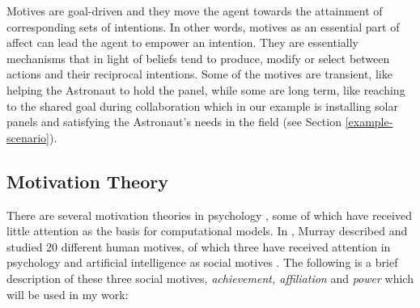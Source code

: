 \documentclass[12pt]{report}
\begin{document}
Motives are goal-driven and they move the agent towards the attainment of
corresponding sets of intentions. In other words, motives as an essential part
of affect can lead the agent to empower an intention. They are essentially
mechanisms that in light of beliefs tend to produce, modify or select between
actions and their reciprocal intentions. Some of the motives are transient, like
helping the Astronaut to hold the panel, while some are long term, like reaching
to the shared goal during collaboration which in our example is installing solar
panels and satisfying the Astronaut's needs in the field (see Section
\ref{example-scenario}).

\subsection{Motivation Theory}
\label{section-motivation-theory}

There are several motivation theories in psychology \cite{beck:motivation,
graham:motivation, laming:understanding-motivation}, some of which have received
little attention as the basis for computational models. In
\cite{murray:personality-exploration}, Murray described and studied 20 different
human motives, of which three have received attention in psychology and
artificial intelligence as social motives
\cite{merrick:acheievement-affiliation-power,
zurbriggen:linking-motives-emotions}. The following is a brief description of
these three social motives, \textit{achievement, affiliation} and \textit{power}
\cite{atkinson:motives-action-society,zurbriggen:linking-motives-emotions}
which will be used in my work:
\end{document}
